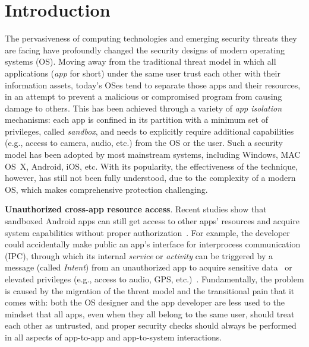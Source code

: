 \documentclass{article}
\newcommand{\ignore}[1]{}
\begin{document}
\section{Introduction}
\label{sec:introduction}
The pervasiveness of computing technologies and emerging security threats they are facing have profoundly changed the security designs of modern operating systems (OS).  Moving away from the traditional threat model in which all applications (\textit{app} for short) under the same user trust each other with their information assets, today's OSes tend to separate those apps and their resources, in an attempt to prevent a malicious or compromised program from causing damage to others.  This has been achieved through a variety of \textit{app isolation} mechanisms:  each app is confined in its partition with a minimum set of privileges, called \textit{sandbox}, and needs to explicitly require additional capabilities (e.g., access to camera, audio, etc.) from the OS or the user. Such a security model has been adopted by most mainstream systems, including Windows, MAC OS~X, Android, iOS, etc. With its popularity, the effectiveness of the technique, however, has still not been fully understood, due to the complexity of a modern OS, which makes comprehensive protection challenging.

\vspace {3pt}\noindent\textbf{Unauthorized cross-app resource access}.  Recent studies show that sandboxed Android apps can still get access to other apps' resources and acquire system capabilities without proper authorization~\cite{Xing:2014:UYA:2650286.2650760}. For example, the developer could accidentally make public an app's interface for interprocess communication (IPC), through which its internal \textit{service} or \textit{activity} can be triggered by a message (called \textit{Intent}) from an unauthorized app to acquire sensitive data~\cite{wang2013unauthorized}\ignore{domain-crossing paper} or elevated privileges (e.g., access to audio, GPS, etc.)~\cite{Davi:2010:PEA:1949317.1949356, Lu_chex:statically, felt2011permission}. Fundamentally, the problem is caused by the migration of the threat model and the transitional pain that it comes with: both the OS designer and the app developer are less used to the mindset that all apps, even when they all belong to the same user, should treat each other as untrusted, and proper security checks should always be performed in all aspects of app-to-app and app-to-system interactions.
\end{document}
